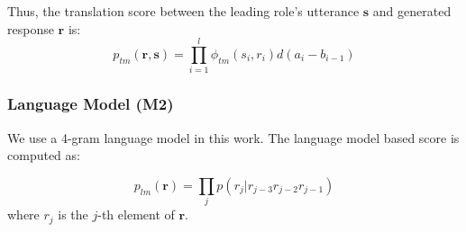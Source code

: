 \documentclass[letterpaper]{article} %
\begin{document}
\begin{CJK*}{UTF8}{gbsn}

Thus, the translation score between the leading role's utterance $\mathbf{s}$ and generated response $\mathbf{r}$ is:
\begin{equation}
	p_{tm}\left( \mathbf{r}, \mathbf{s} \right) = \prod_{i=1}^{l}\phi_{tm}({s}_i, {r}_i) d(a_i - b_{i-1})
\end{equation}

\subsubsection{Language Model (M2)}

We use a 4-gram language model in this work. The language model based score is computed as:

\begin{equation}
	p_{lm}({\mathbf r}) = \prod_j p(r_j|r_{j-3}r_{j-2}r_{j-1})
\end{equation}
where $r_j$ is the $j$-th element of $\mathbf r$.

%
%
%


\end{CJK*}
\end{document}
